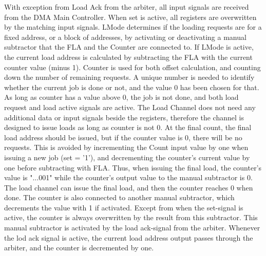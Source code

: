 \begin{appendix}
With exception from Load Ack from the arbiter, all input signals are received from the DMA Main Controller.
When set is active, all registers are overwritten by the matching input signals.
LMode determines if the loading requests are for a fixed address, or a block of addresses, by activating or deactivating a manual subtractor that the FLA and the Counter are connected to.
If LMode is active, the current load address is calculated by subtracting the FLA with the current counter value (minus 1).
Counter is used for both offset calculation, and counting down the number of remaining requests.
A unique number is needed to identify whether the current job is done or not, and the value 0 has been chosen for that.
As long as counter has a value above 0, the job is not done, and both load request and load active signals are active.
The Load Channel does not need any additional data or input signals beside the registers, therefore the channel is designed to issue loads as long as counter is not 0.
At the final count, the final load address should be issued, but if the counter value is 0, there will be no requests.
This is avoided by incrementing the Count input value by one when issuing a new job (set = '1'), and decrementing the counter's current value by one before subtracting with FLA.
Thus, when issuing the final load, the counter's value is "...001" while the counter's output value to the manual subtractor is 0.
The load channel can issue the final load, and then the counter reaches 0 when done.
The counter is also connected to another manual subtractor, which decrements the value with 1 if activated.
Except from when the set-signal is active, the counter is always overwritten by the result from this subtractor.
This manual subtractor is activated by the load ack-signal from the arbiter.
Whenever the lod ack signal is active, the current load address output passes through the arbiter, and the counter is decremented by one.


\end{appendix}
